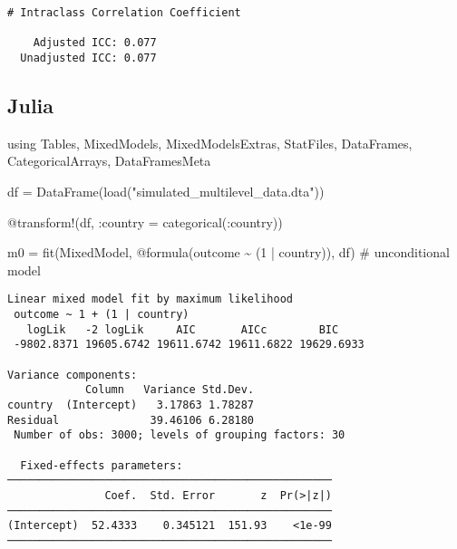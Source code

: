 \documentclass[
  letterpaper,
  DIV=11,
  numbers=noendperiod]{scrreprt}
\newenvironment{Shaded}{\begin{snugshade}}{\end{snugshade}}
\newcommand{\BuiltInTok}[1]{\textcolor[rgb]{0.00,0.23,0.31}{#1}}
\newcommand{\CommentTok}[1]{\textcolor[rgb]{0.37,0.37,0.37}{#1}}
\newcommand{\FloatTok}[1]{\textcolor[rgb]{0.68,0.00,0.00}{#1}}
\newcommand{\FunctionTok}[1]{\textcolor[rgb]{0.28,0.35,0.67}{#1}}
\newcommand{\ImportTok}[1]{\textcolor[rgb]{0.00,0.46,0.62}{#1}}
\newcommand{\NormalTok}[1]{\textcolor[rgb]{0.00,0.23,0.31}{#1}}
\newcommand{\OperatorTok}[1]{\textcolor[rgb]{0.37,0.37,0.37}{#1}}
\newcommand{\PreprocessorTok}[1]{\textcolor[rgb]{0.68,0.00,0.00}{#1}}
\newcommand{\StringTok}[1]{\textcolor[rgb]{0.13,0.47,0.30}{#1}}
\begin{document}
\begin{verbatim}
# Intraclass Correlation Coefficient

    Adjusted ICC: 0.077
  Unadjusted ICC: 0.077
\end{verbatim}

\subsection{Julia}

\begin{Shaded}
\begin{Highlighting}[]
\ImportTok{using} \BuiltInTok{Tables}\NormalTok{, }\BuiltInTok{MixedModels}\NormalTok{, }\BuiltInTok{MixedModelsExtras}\NormalTok{, }
\BuiltInTok{StatFiles}\NormalTok{, }\BuiltInTok{DataFrames}\NormalTok{, }\BuiltInTok{CategoricalArrays}\NormalTok{, }\BuiltInTok{DataFramesMeta}

\NormalTok{df }\OperatorTok{=} \FunctionTok{DataFrame}\NormalTok{(}\FunctionTok{load}\NormalTok{(}\StringTok{"simulated\_multilevel\_data.dta"}\NormalTok{))}
\end{Highlighting}
\end{Shaded}

\begin{Shaded}
\begin{Highlighting}[]
\PreprocessorTok{@transform}\NormalTok{!(df, }\OperatorTok{:}\NormalTok{country }\OperatorTok{=} \FunctionTok{categorical}\NormalTok{(}\OperatorTok{:}\NormalTok{country))}
\end{Highlighting}
\end{Shaded}

\begin{Shaded}
\begin{Highlighting}[]

\NormalTok{m0 }\OperatorTok{=} \FunctionTok{fit}\NormalTok{(MixedModel, }
         \PreprocessorTok{@formula}\NormalTok{(outcome }\OperatorTok{\textasciitilde{}}\NormalTok{ (}\FloatTok{1} \OperatorTok{|}\NormalTok{ country)), df) }\CommentTok{\# unconditional model}
\end{Highlighting}
\end{Shaded}

\begin{verbatim}
Linear mixed model fit by maximum likelihood
 outcome ~ 1 + (1 | country)
   logLik   -2 logLik     AIC       AICc        BIC    
 -9802.8371 19605.6742 19611.6742 19611.6822 19629.6933

Variance components:
            Column   Variance Std.Dev.
country  (Intercept)   3.17863 1.78287
Residual              39.46106 6.28180
 Number of obs: 3000; levels of grouping factors: 30

  Fixed-effects parameters:
──────────────────────────────────────────────────
               Coef.  Std. Error       z  Pr(>|z|)
──────────────────────────────────────────────────
(Intercept)  52.4333    0.345121  151.93    <1e-99
──────────────────────────────────────────────────
\end{verbatim}
\end{document}
